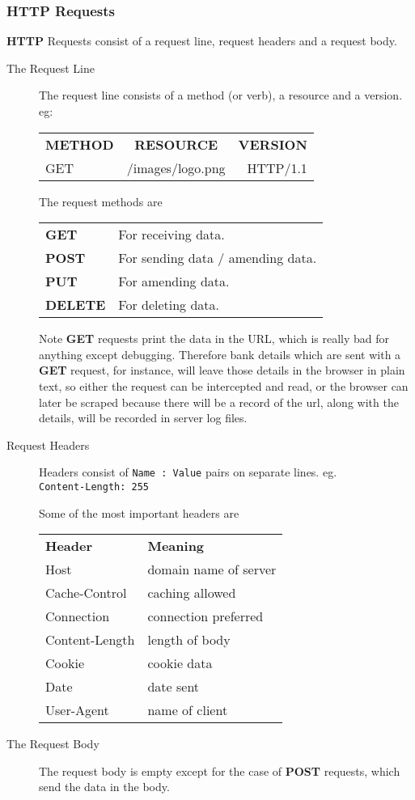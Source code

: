 \documentclass[11pt]{article}
\begin{document}
\subsubsection{HTTP Requests}

\textbf{HTTP} Requests consist of a request line, request headers and a request body.
\begin{description}
\item[The Request Line]
The request line consists of a method (or verb), a resource and a version.
eg:

\begin{tabular}{ l c r }
  \textbf{METHOD} & \textbf{RESOURCE} & \textbf{VERSION} \\
  GET & /images/logo.png & HTTP/1.1 \\
\end{tabular}

The request methods are

\begin{tabular}{ l l }
  \textbf{GET} & For receiving data. \\
  \textbf{POST} & For sending data / amending data. \\
  \textbf{PUT} & For amending data. \\
  \textbf{DELETE} & For deleting data. \\
\end{tabular}

Note \textbf{GET} requests print the data in the URL, which is really bad for anything except debugging. Therefore bank details which are sent with a \textbf{GET} request, for instance, will leave those details in the browser in plain text, so either the request can be intercepted and read, or the browser can later be scraped because there will be a record of the url, along with the details, will be recorded in server log files.
\item[Request Headers]
Headers consist of \texttt{Name : Value} pairs on separate lines. eg. \\
\texttt{Content-Length: 255}
 
Some of the most important headers are \\
\begin{tabular}{ l l }
  \textbf{Header} & \textbf{Meaning} \\
  Host & domain name of server \\
  Cache-Control & caching allowed \\
  Connection & connection preferred \\
  Content-Length & length of body \\
  Cookie & cookie data \\
  Date & date sent \\
  User-Agent &  name of client \\
\end{tabular}
\item[The Request Body]
The request body is empty except for the case of \textbf{POST} requests, which send the data in the body.
\end{description}
\end{document}
